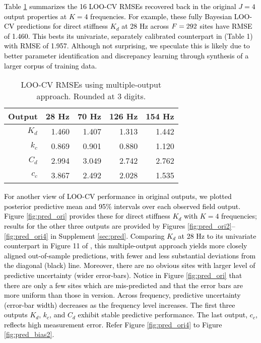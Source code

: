 \documentclass[12pt]{article}
\newcommand{\blu}[1]{\textcolor{black}{#1}} %
\newcommand{\blunew}[1]{\textcolor{black}{#1}} %
\begin{document}
\blu{ Table \ref{tab:pred} summarizes the 16 LOO-CV 
RMSEs recovered back in the original $J=4$ output properties at $K=4$ frequencies. 
For example, these fully Bayesian LOO-CV
predictions for direct stiffness $K_d$ at 28 Hz 
across $\blunew{F}=292$ sites have RMSE of 1.460.  This bests its univariate,
separately calibrated counterpart in \citeauthor{Huang:2018} (Table 1) with
RMSE of 1.957.  Although not surprising, 
we speculate this is likely due to better parameter
identification and discrepancy learning through synthesis of a larger corpus
of training data. 
}
\begin{table}[ht!]
\centering
\begin{tabular}{r | r | r | r | r }
Output  & 28 Hz &  70 Hz &  126 Hz & 154 Hz \\
\hline
$K_d$ & 1.460  & 1.407 & 1.313 & 1.442 \\
$k_c$ & 0.869 & 0.901 & 0.880 & 1.120\\
$C_d$ & 2.994 & 3.049 & 2.742 & 2.762 \\
$c_c$ & 3.867 & 2.492 & 2.028 & 1.535 \\
\end{tabular}
\caption{LOO-CV  RMSEs using multiple-output approach. Rounded at 3 digits. }
\label{tab:pred}
\end{table} 
\blu{ For another view of LOO-CV performance in original 
outputs, we plotted posterior predictive mean and 95\% intervals over each
observed field output. Figure \ref{fig:pred_ori} provides these for direct
 stiffness $K_d$ with $K=4$ frequencies; results for the other three outputs are provided
 by Figures \ref{fig:pred_ori2}--\ref{fig:pred_ori4} in Supplement
 \ref{sec:pred}. Comparing $K_d$ at 28 Hz to its univariate
 counterpart in Figure 11 of \cite{Huang:2018}, this multiple-output
 approach yields  more closely aligned out-of-sample predictions, with fewer
 and less substantial deviations from the diagonal (black) line.  Moreover,
 there are no obvious sites with larger level of predictive uncertainty (wider
 error-bars). Notice in Figure \ref{fig:pred_ori} that there are only a few
 sites which are mis-predicted and that the error bars are more uniform than
 those in \citeauthor{Huang:2018} version. Across frequency, predictive
 uncertainty (error-bar width) decreases as the frequency level increases.
 The first three outputs $K_d$, $k_c$, and $C_d$ exhibit stable
 predictive performance.  The last output, $c_c$, reflects high measurement error.
Refer Figure \ref{fig:pred_ori4} to Figure \ref{fig:pred_bias2}.}
\end{document}
